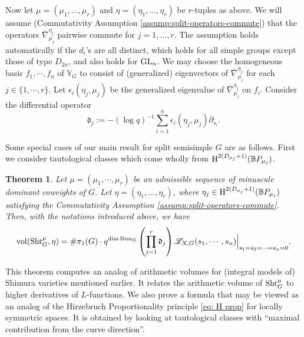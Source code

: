 \documentclass[reqno]{amsart}
\numberwithin{equation}{subsection}
\newtheorem{theorem}[subsubsection]{Theorem}
\theoremstyle{definition}
\def\BB{\mathbb{B}}
\def\VV{\mathbb{V}}
\newcommand\frd{\mathfrak{d}}
\newcommand{\sL}{{\mathscr{L}}}
\newcommand{\Bun}{\textup{Bun}}
\newcommand\Sht{\textup{Sht}}
\newcommand{\vol}{\textup{vol}}
\newcommand\GL{\textup{GL}}
\newcommand{\ov}{\overline}
\newcommand{\cohog}[2]{\textup{H}^{#1}({#2})}     %
\newcommand{\e}{\epsilon}
\newcommand{\y}{\eta}
\newcommand{\om}{\omega}
\newcommand\nb{\nabla}
\newcommand\pl{\partial}
\newcommand{\ol}[1]{\overline{#1}}
\begin{document}
Now let $\mu  = (\mu_1, \ldots, \mu_r)$ and $\eta = (\eta_1, \ldots, \eta_r)$ be $r$-tuples as above.
We will assume (Commutativity Assumption \ref{assump:split-operators-commute}) that the operators $\ov\nb^{\y_j}_{ \mu_j}$ pairwise commute for $j=1, \ldots, r$.
The assumption holds automatically if the $d_i$'s are all distinct, which holds for all simple groups except those of type $D_{2n}$, and also holds for $\GL_n$. We may choose the homogeneous basis $f_1,\cdots, f_n$ of $\VV_G$ to consist of (generalized) eigenvectors of $\ov\nb^{\y_j}_{\mu_j}$ for each $j\in \{1,\cdots,r\}$. Let $\e_i(\y_j, \mu_j)$ be the generalized eigenvalue of $\ov\nb^{\y_j}_{\mu_j}$ on $f_i$. 
Consider the differential operator
\begin{equation*}
\frd_{j}:=-(\log q)^{-1}\sum_{i=1}^{n}\e_{i}(\y_{j},  \mu_j)\pl_{s_{i}}.
\end{equation*}


Some special cases of our main result for split semisimple $G$ are as follows. First we consider tautological classes which come wholly from $\cohog{2(D_{\mu_j}+1)}{\BB P_{\mu_j}}$. 
 
\begin{theorem}\label{th: main}
Let $\mu=(\mu_{1},\cdots, \mu_{r})$ be an admissible sequence of minuscule dominant coweights of $G$. Let $\eta = (\eta_1, \ldots, \eta_r)$, where $\y_{j}\in \cohog{2(D_{\mu_j}+1)}{\BB P_{\mu_j}}$ satisfying the Commutativity Assumption \ref{assump:split-operators-commute}. Then, with the notations introduced above, we have 
\begin{equation}\label{eq:vol eta}
\vol(\Sht^{\mu}_{G}, \eta) = \# \pi_1(G) \cdot q^{\dim \Bun_{G}}\left(\prod_{j=1}^{r}\frd_{j}\right)\sL_{X,G}(s_{1},\cdots, s_{n})\Big|_{s_{1}=s_{2}=\cdots=s_{n}=0}.
\end{equation}
\end{theorem}

This theorem computes an analog of arithmetic volumes for (integral models of) Shimura varieties mentioned earlier. It relates the arithmetic volume of $\Sht_G^{\mu}$ to higher derivatives of $L$-functions. We also prove a formula that may be viewed as an analog of the Hirzebruch Proportionality principle \eqref{eq: H prop} for locally symmetric spaces. It is obtained by looking at tautological classes with ``maximal contribution from the curve direction''. 
\end{document}
